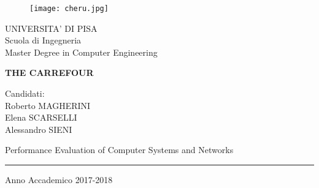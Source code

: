 \thispagestyle{empty}
\begin{titlepage}
\vspace*{-1.5cm} \bfseries{
\begin{center}
  

    \begin{figure}[htbp]
    \begin{center}
    \texttt{[image: cheru.jpg]}
    \end{center}
  \end{figure}
  \large
  UNIVERSITA' DI PISA\\
  \normalsize
  Scuola di Ingegneria\\
  Master Degree in Computer Engineering\\


  \vspace*{3.0cm} 
  \vspace*{0.5cm}
  \LARGE


  \textbf{THE CARREFOUR}\\

  \vspace*{1.75truecm} \large
\end{center}
\vspace*{2.0cm} \large

\begin{flushright}


  Candidati:\\ 
    Roberto MAGHERINI \\
    Elena SCARSELLI \\
    Alessandro SIENI \\


\end{flushright}
\vspace*{3.5cm}
\begin{center}

Performance Evaluation of Computer Systems and Networks \\
\vspace*{0.25cm}

\hrule
\vspace*{0.25cm}
Anno Accademico 2017-2018\\
\end{center} \clearpage
}

\end{titlepage}